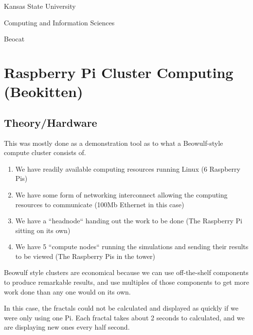 \documentclass[a4paper,10pt]{article}
\begin{document}
\noindent
\begin{minipage}[t]{0.33\textwidth}
	\begin{center}
		\textcolor[RGB]{81,40,136}{Kansas State University}
	\end{center}
\end{minipage}
\begin{minipage}[t]{0.33\textwidth}
	\begin{center}
		\textcolor[RGB]{81,40,136}{Computing and Information Sciences}
	\end{center}
\end{minipage}
\begin{minipage}[t]{0.33\textwidth}
	\begin{center}
		\textcolor[RGB]{81,40,136}{Beocat}
	\end{center}
\end{minipage}

\section{Raspberry Pi Cluster Computing (Beokitten)}
\subsection{Theory/Hardware}
This was mostly done as a demonstration tool as to what a Beowulf-style compute cluster consists of.
\begin{enumerate}
\item We have readily available computing resources running Linux (6 Raspberry Pis)
\item We have some form of networking interconnect allowing the computing resources to communicate (100Mb Ethernet in this case)
\item We have a ``headnode`` handing out the work to be done (The Raspberry Pi sitting on its own)
\item We have 5 ``compute nodes`` running the simulations and sending their results to be viewed (The Raspberry Pis in the tower)
\end{enumerate}

Beowulf style clusters are economical because we can use off-the-shelf components to produce remarkable results, and use multiples of those components to get more work done than any one would on its own.

In this case, the fractals could not be calculated and displayed as quickly if we were only using one Pi.
Each fractal takes about 2 seconds to calculated, and we are displaying new ones every half second.
\end{document}
